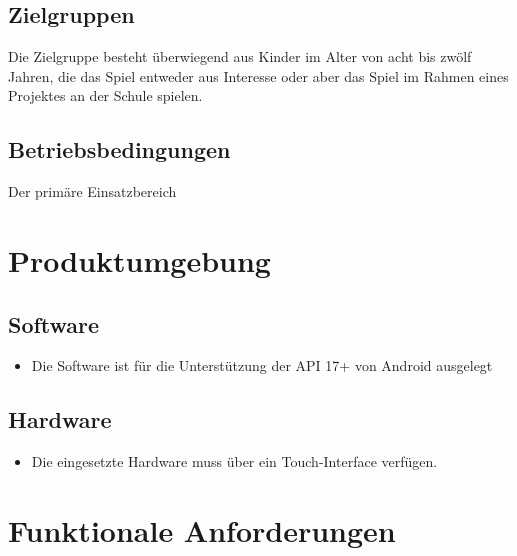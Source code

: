 \documentclass{scrartcl}
\begin{document}
\subsection{Zielgruppen}

Die Zielgruppe besteht überwiegend aus Kinder im Alter von acht bis zwölf Jahren, die das Spiel entweder aus Interesse oder aber das Spiel im Rahmen eines Projektes an der Schule spielen.

\subsection{Betriebsbedingungen}

Der primäre Einsatzbereich 

\clearpage








\section{Produktumgebung}

\subsection{Software}

\begin{itemize}
	\item Die Software ist für die Unterstützung der API 17+ von Android ausgelegt
\end{itemize}

\subsection{Hardware}

\begin{itemize}
	\item Die eingesetzte Hardware muss über ein Touch-Interface verfügen.
\end{itemize}

\clearpage









\section{Funktionale Anforderungen}
\end{document}
